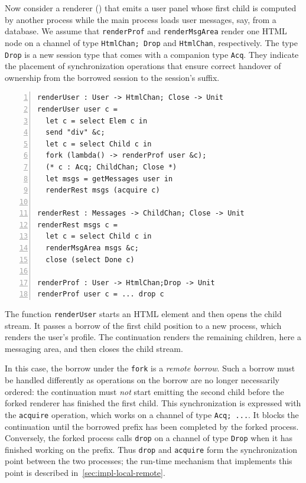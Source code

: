 Now consider a renderer () that emits a user panel whose first child is
computed by another process while the main process loads user
messages, say, from a database. We assume that
\lstinline{renderProf} and \lstinline{renderMsgArea} render
one HTML node on a channel of type \lstinline{HtmlChan; Drop} and
\lstinline{HtmlChan}, respectively. The type \lstinline{Drop}
is a new session type that comes with a companion type
\lstinline{Acq}. They indicate the placement of synchronization
operations that ensure correct handover of ownership from the borrowed session
to the session's suffix.
\begin{lstlisting}[numbers=left,float,caption={Rendering example},captionpos=b,label={lst:rendering-example}]
renderUser : User -> HtmlChan; Close -> Unit
renderUser user c =
  let c = select Elem c in
  send "div" &c;
  let c = select Child c in
  fork (lambda() -> renderProf user &c);
  (* c : Acq; ChildChan; Close *)
  let msgs = getMessages user in
  renderRest msgs (acquire c)

renderRest : Messages -> ChildChan; Close -> Unit
renderRest msgs c =
  let c = select Child c in
  renderMsgArea msgs &c;
  close (select Done c)

renderProf : User -> HtmlChan;Drop -> Unit
renderProf user c = ... drop c
\end{lstlisting}
The function \lstinline{renderUser} starts an HTML element and then
opens the child stream. It passes a borrow of the
first child position to a new process, which renders the user's profile.
The continuation renders the remaining children, here a messaging
area, and then closes the child stream. 

In this case, the borrow under the \lstinline{fork} is a \emph{remote
  borrow}. Such a borrow must be handled differently as operations on
the borrow are no longer necessarily ordered: the 
continuation must \emph{not} start emitting the second child before the
forked renderer has finished the first child. This synchronization is
expressed with the \lstinline{acquire} operation, which works on a
channel of type \lstinline{Acq; ...}. It blocks the
continuation until the borrowed prefix has been completed by the
forked process. Conversely, the forked process calls \lstinline{drop}
on a channel of type \lstinline{Drop} when it has finished working on
the prefix. Thus \lstinline{drop} and
\lstinline{acquire} form the synchronization point between the two
processes; the run-time mechanism that implements this point is
described in~\cref{sec:impl-local-remote}.

